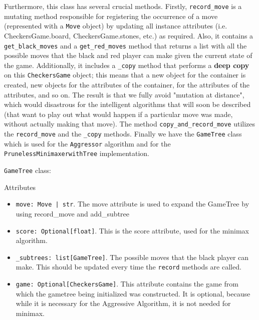 \documentclass[fontsize=11pt]{article}
\begin{document}
\begin{enumerate}
    Furthermore, this class has several crucial methods. Firstly, \texttt{record\_move} is a mutating method responsible for registering the occurrence of a move (represented with a \texttt{Move} object) by updating all instance attributes (i.e. CheckersGame.board, CheckersGame.stones, etc.) as required. Also, it contains a \texttt{get\_black\_moves} and a \texttt{get\_red\_moves} method that returns a list with all the possible moves that the black and red player can make given the current state of the game. Additionally, it includes a \texttt{\_copy} method that performs a \textbf{deep copy} on this \texttt{CheckersGame} object; this means that a new object for the container is created, new objects for the attributes of the container, for the attributes of the attributes, and so on. The result is that we fully avoid "mutation at distance", which would disastrous for the intelligent algorithms that will soon be described (that want to play out what would happen if a particular move was made, without actually making that move). The method \texttt{copy\_and\_record\_move} utilizes the \texttt{record\_move} and the \texttt{\_copy} methods.
\newline
\newline
\newline
\newline
\newline    
\newline
Finally we have the \texttt{GameTree} class which is used for the \texttt{Aggressor} algorithm and for the \texttt{PrunelessMinimaxerwithTree} implementation.

\newline
\texttt{GameTree} class:

\begin{center} Attributes \end{center}
\begin{itemize}
  \item \texttt{move: Move | str}. 
  The move attribute is used to expand the GameTree by using record\_move and add\_subtree

  \item \texttt{score: Optional[float]}.
  This is the score attribute, used for the minimax algorithm.
  
  \item \texttt{\_subtrees: list[GameTree]}.
  The possible moves that the black player can make. This should be updated every time the \texttt{record} methods are called.

  \item \texttt{game: Optional[CheckersGame]}.
  This attribute contains the game from which the gametree being initialized was constructed. It is optional, because while it is necessary for the Aggressive Algorithm, it is not needed for minimax.
  

\end{itemize}
\end{enumerate}
\end{document}
